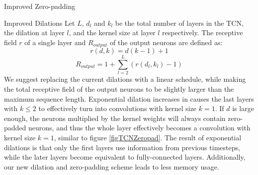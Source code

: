 \documentclass[paperwidth=24in,paperheight=48in, fontscale=0.4166666666666]{baposter}
\begin{document}
\begin{poster}
\begin{posterbox}[name=zeropad,column=0,below=method]{Improved Zero-padding}
\end{posterbox}









\begin{posterbox}[name=dilation,span=1,column=0,above=bottom, below=zeropad]{Improved Dilations}
Let $L$, $d_l$ and $k_l$ be the total number of layers in the TCN, the dilation at layer $l$, and the kernel size at layer $l$ respectively. The receptive field $r$ of a single layer and $R_{output}$ of the output neurons are defined as:
\begin{equation}
r(d, k) = d(k-1) +1
\end{equation}
\begin{equation}
R_{output} = 1+\sum^L_{l=2} (r(d_l, k_l) -1)
\end{equation}
We suggest replacing the current dilations with a linear schedule, while making the total receptive field of the output neurons to be slightly larger than the maximum sequence length. Exponential dilation increases in \cite{tcn} causes the last layers with $k \leq 2$ to effectively turn into convolutions with kernel size $k=1$. If $d$ is large enough, the neurons multiplied by the kernel weights will always contain zero-padded neurons, and thus the whole layer effectively becomes a convolution with kernel size $k=1$, similar to figure \ref{figTCNZeropad}. The result of exponential dilations is that only the first layers use information from previous timesteps, while the later layers become equivalent to fully-connected layers. Additionally, our new dilation and zero-padding scheme leads to less memory usage.

\end{posterbox}


















\end{poster}
\end{document}
